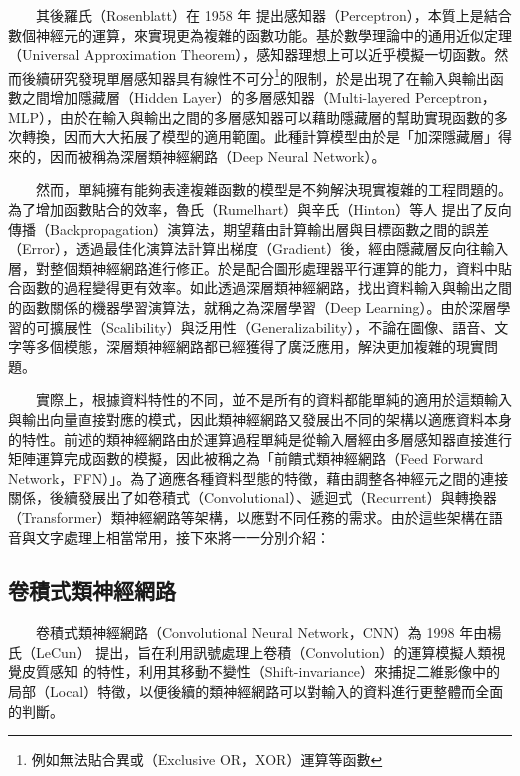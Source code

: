 　　其後羅氏（Rosenblatt）在 1958 年 \cite{rosenblatt_perceptron_1958} 提出感知器（Perceptron），本質上是結合數個神經元的運算，來實現更為複雜的函數功能。基於數學理論中的通用近似定理（Universal Approximation Theorem）\cite{funahashi_approximate_1989}，感知器理想上可以近乎模擬一切函數。然而後續研究發現單層感知器具有線性不可分\footnote{例如無法貼合異或（Exclusive OR，XOR）運算等函數}的限制，於是出現了在輸入與輸出函數之間增加隱藏層（Hidden Layer）的多層感知器（Multi-layered Perceptron，MLP），由於在輸入與輸出之間的多層感知器可以藉助隱藏層的幫助實現函數的多次轉換，因而大大拓展了模型的適用範圍。此種計算模型由於是「加深隱藏層」得來的，因而被稱為深層類神經網路（Deep Neural Network）。
  
　　然而，單純擁有能夠表達複雜函數的模型是不夠解決現實複雜的工程問題的。為了增加函數貼合的效率，魯氏（Rumelhart）與辛氏（Hinton）等人 \cite{rumelhart_learning_1986, rumelhart_learning_1987} 提出了反向傳播（Backpropagation）演算法，期望藉由計算輸出層與目標函數之間的誤差（Error），透過最佳化演算法計算出梯度（Gradient）後，經由隱藏層反向往輸入層，對整個類神經網路進行修正。於是配合圖形處理器平行運算的能力，資料中貼合函數的過程變得更有效率。如此透過深層類神經網路，找出資料輸入與輸出之間的函數關係的機器學習演算法，就稱之為深層學習（Deep Learning）。由於深層學習的可擴展性（Scalibility）與泛用性（Generalizability），不論在圖像、語音、文字等多個模態，深層類神經網路都已經獲得了廣泛應用，解決更加複雜的現實問題。

　　實際上，根據資料特性的不同，並不是所有的資料都能單純的適用於這類輸入與輸出向量直接對應的模式，因此類神經網路又發展出不同的架構以適應資料本身的特性。前述的類神經網路由於運算過程單純是從輸入層經由多層感知器直接進行矩陣運算完成函數的模擬，因此被稱之為「前饋式類神經網路（Feed Forward Network，FFN）」。為了適應各種資料型態的特徵，藉由調整各神經元之間的連接關係，後續發展出了如卷積式（Convolutional）、遞迴式（Recurrent）與轉換器（Transformer）類神經網路等架構，以應對不同任務的需求。由於這些架構在語音與文字處理上相當常用，接下來將一一分別介紹：

\subsection{卷積式類神經網路}

　　卷積式類神經網路（Convolutional Neural Network，CNN）為 1998 年由楊氏（LeCun） \cite{lecun_gradient-based_1998} 提出，旨在利用訊號處理上卷積（Convolution）的運算模擬人類視覺皮質感知 \cite{hubel_receptive_1959} 的特性，利用其移動不變性（Shift-invariance）來捕捉二維影像中的局部（Local）特徵，以便後續的類神經網路可以對輸入的資料進行更整體而全面的判斷。


